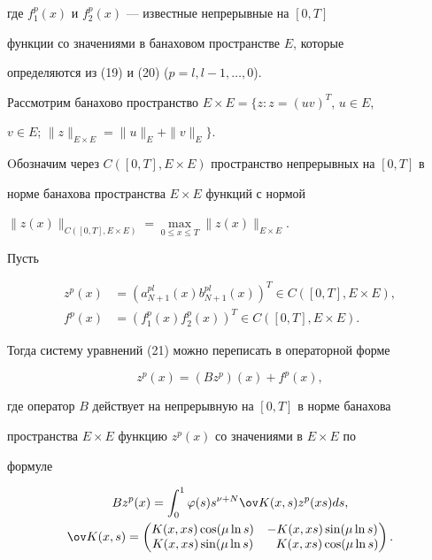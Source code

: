где $f^p_1(x)$ и $f^p_2(x)$ --- известные непрерывные на $[0,T]$ 


функции со значениями в банаховом пространстве $E$, которые 


определяются из (19) и (20) ($p=l,l-1,\dotsc,0$). 


 


Рассмотрим банахово пространство $E\times E=\{z:z=(uv)^T$, $u\in E$, 


$v\in E$; $\|z\|_{E\times E}=\|u\|_E+\|v\|_E\}$. 


Oбозначим через $C([0,T],E\times E)$ пространство непрерывных на $[0,T]$ в 


норме банахова пространства $E\times E$ функций с нормой 


$\|z(x)\|_{C([0,T],E\times E)}= \max\limits_{0\le x\le T} 


\|z(x)\|_{E\times E}$. 


 


Пусть 


\begin{align*} 


z^p(x)&=(a^{pl}_{N+1}(x)b^{pl}_{N+1}(x))^T\in 


C([0,T],E\times E),\\ 


f^p(x)&=(f^p_1(x)f^p_2(x))^T\in C([0,T],E\times E). 


\end{align*} 


 


Тогда систему уравнений (21) можно переписать в операторной форме 


\begin{equation} 


z^p(x)=(B z^p)(x)+f^p(x), 


\end{equation} 


где оператор $B$ действует на непрерывную на $[0,T]$ в норме банахова 


пространства $E\times E$ функцию $z^p(x)$ со значениями в $E\times E$ по 


формуле 


\begin{gather*} 


B z^p(x)=\int^1_0\varphi(s)s^{\nu+N}\ov K(x,s)z^p(xs)ds,\\ 


\ov K(x,s)= 


\begin{pmatrix} 


K(x,xs)\cos(\mu\ln s) & -K(x,xs)\sin(\mu\ln s)\\ 


K(x,xs)\sin(\mu\ln s) & \phantom{-}K(x,xs)\cos(\mu\ln s) 


\end{pmatrix}. 


\end{gather*} 


